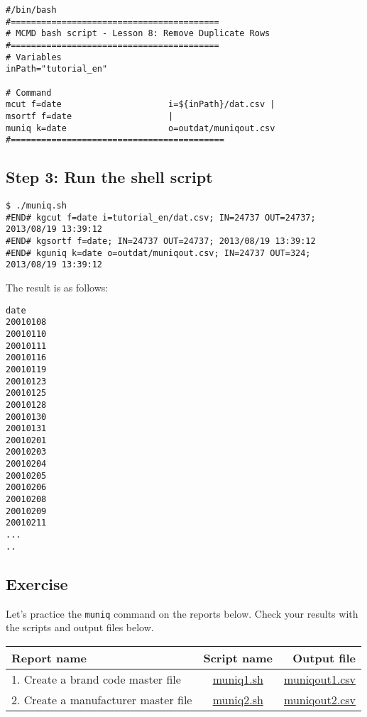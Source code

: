 \begin{verbatim}
#/bin/bash
#=========================================
# MCMD bash script - Lesson 8: Remove Duplicate Rows
#=========================================
# Variables
inPath="tutorial_en"

# Command 
mcut f=date                     i=${inPath}/dat.csv |
msortf f=date                   |
muniq k=date                    o=outdat/muniqout.csv
#==========================================
\end{verbatim}

\subsection{Step 3: Run the shell script }

\begin{verbatim}
$ ./muniq.sh 
#END# kgcut f=date i=tutorial_en/dat.csv; IN=24737 OUT=24737; 2013/08/19 13:39:12
#END# kgsortf f=date; IN=24737 OUT=24737; 2013/08/19 13:39:12
#END# kguniq k=date o=outdat/muniqout.csv; IN=24737 OUT=324; 2013/08/19 13:39:12
\end{verbatim}

\noindent
The result is as follows: 

\begin{verbatim}
date
20010108
20010110
20010111
20010116
20010119
20010123
20010125
20010128
20010130
20010131
20010201
20010203
20010204
20010205
20010206
20010208
20010209
20010211
...
..
\end{verbatim}



\subsection{Exercise }

Let's practice the \verb|muniq| command on the reports below. Check your results with the scripts and output files below. 

\begin{table}[htbp]
{\small
\begin{tabular}{ l | c || r }
\hline
\textbf{Report name}   & \textbf{Script name} & \textbf{Output file}  \\
\hline
1. Create a brand code master file & \href{exercise/muniq1.sh}{muniq1.sh} & \href{exercise/outdat/muniqout1.csv}{muniqout1.csv} \\
2. Create a manufacturer master file & \href{exercise/muniq2.sh}{muniq2.sh} & \href{exercise/outdat/muniqout2.csv}{muniqout2.csv} \\


\hline
\end{tabular} 
}
\end{table} 


%
